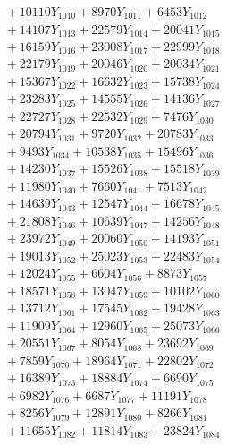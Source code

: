 \documentclass[a4paper,10pt]{article}
\begin{document}
{\begin{align}
&\;  + 10110 Y_{1010} + 8970 Y_{1011} + 6453 Y_{1012} \\[0.3ex]
&\;  + 14107 Y_{1013} + 22579 Y_{1014} + 20041 Y_{1015} \\[0.3ex]
&\;  + 16159 Y_{1016} + 23008 Y_{1017} + 22999 Y_{1018} \\[0.5ex]\allowbreak
&\;  + 22179 Y_{1019} + 20046 Y_{1020} + 20034 Y_{1021} \\[0.3ex]
&\;  + 15367 Y_{1022} + 16632 Y_{1023} + 15738 Y_{1024} \\[0.3ex]
&\;  + 23283 Y_{1025} + 14555 Y_{1026} + 14136 Y_{1027} \\[0.3ex]
&\;  + 22727 Y_{1028} + 22532 Y_{1029} + 7476 Y_{1030} \\[0.3ex]
&\;  + 20794 Y_{1031} + 9720 Y_{1032} + 20783 Y_{1033} \\[0.3ex]
&\;  + 9493 Y_{1034} + 10538 Y_{1035} + 15496 Y_{1036} \\[0.3ex]
&\;  + 14230 Y_{1037} + 15526 Y_{1038} + 15518 Y_{1039} \\[0.3ex]
&\;  + 11980 Y_{1040} + 7660 Y_{1041} + 7513 Y_{1042} \\[0.3ex]
&\;  + 14639 Y_{1043} + 12547 Y_{1044} + 16678 Y_{1045} \\[0.3ex]
&\;  + 21808 Y_{1046} + 10639 Y_{1047} + 14256 Y_{1048} \\[0.5ex]\allowbreak
&\;  + 23972 Y_{1049} + 20060 Y_{1050} + 14193 Y_{1051} \\[0.3ex]
&\;  + 19013 Y_{1052} + 25023 Y_{1053} + 22483 Y_{1054} \\[0.3ex]
&\;  + 12024 Y_{1055} + 6604 Y_{1056} + 8873 Y_{1057} \\[0.3ex]
&\;  + 18571 Y_{1058} + 13047 Y_{1059} + 10102 Y_{1060} \\[0.3ex]
&\;  + 13712 Y_{1061} + 17545 Y_{1062} + 19428 Y_{1063} \\[0.3ex]
&\;  + 11909 Y_{1064} + 12960 Y_{1065} + 25073 Y_{1066} \\[0.3ex]
&\;  + 20551 Y_{1067} + 8054 Y_{1068} + 23692 Y_{1069} \\[0.3ex]
&\;  + 7859 Y_{1070} + 18964 Y_{1071} + 22802 Y_{1072} \\[0.3ex]
&\;  + 16389 Y_{1073} + 18884 Y_{1074} + 6690 Y_{1075} \\[0.3ex]
&\;  + 6982 Y_{1076} + 6687 Y_{1077} + 11191 Y_{1078} \\[0.5ex]\allowbreak
&\;  + 8256 Y_{1079} + 12891 Y_{1080} + 8266 Y_{1081} \\[0.3ex]
&\;  + 11655 Y_{1082} + 11814 Y_{1083} + 23824 Y_{1084} \\[0.3ex]

\end{align}}
\end{document}
